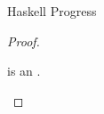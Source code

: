 \begin{theorem}{Haskell Progress}
\begin{proof}
\begin{case}{\psconsh}

\psconsh is an \prouv.

\end{case}


\newcommand{\psfapph}{\expfapp{\first{\varexph}}{\second{\varexph}}\xspace}
\renewcommand{\x}{\expfabss{\varvarh}{\first{\vartyh}}{\third{\varexph}}\xspace}

\begin{case}{\psfapph}

\pshypby
{\first{\varexph}}
{\third{\varexph}}
\psvalifeqh
{\first{\varexph}}
{\tyfun{\first{\vartyh}}{\second{\vartyh}}}
{\x}
\psred
{\expfapp{(\x)}{\second{\varexph}}}
{\expsubst{\third{\varexph}}{\second{\varexph}}{\varvarh}}
\pssub
{\first{\varexph}}
{\third{\varexph}}
{\psfapph}
{\expfapp{\third{\varexph}}{\second{\varexph}}}
\pserr
{\first{\varexph}}
{\psfapph}

\end{case}


\newcommand{\pstapp}{\exptapp{\first{\varexph}}{\first{\vartyh}}\xspace}
\renewcommand{\x}{\exptabs{\tyvarh}{\second{\varexph}}\xspace}

\begin{case}{\pstapp}

\pshypby
{\first{\varexph}}
{\second{\varexph}}
\psvalifeqh
{\first{\varexph}}
{\tyfor{\tyvarh}{\second{\vartyh}}}
{\x}
\psred
{\exptapp{(\x)}{\first{\vartyh}}}
{\expsubst{\second{\varexph}}{\first{\vartyh}}{\tyvarh}}
\pssub
{\first{\varexph}}
{\second{\varexph}}
{\pstapp}
{\exptapp{\second{\varexph}}{\first{\vartyh}}}
\pserr
{\first{\varexph}}
{\pstapp}

\end{case}


\newcommand{\psfix}{\expfix{\first{\varexph}}\xspace}
\renewcommand{\x}{\expfabss{\varvarh}{\vartyh}{\second{\varexph}}\xspace}
\renewcommand{\y}{\expfix{(\x)}}

\begin{case}{\psfix}

\pshypby
{\first{\varexph}}
{\second{\varexph}}
\psvalifeqh
{\first{\varexph}}
{\tyfun{\vartyh}{\vartyh}}
{\x}
\psred
{\y}
{\expsubst{\second{\varexph}}{\y}{\varvarh}}
\pssub
{\first{\varexph}}
{\second{\varexph}}
{\psfix}
{\expfix{\second{\varexph}}}
\pserr
{\first{\varexph}}
{\psfix}


\end{case}
\end{proof}
\end{theorem}
